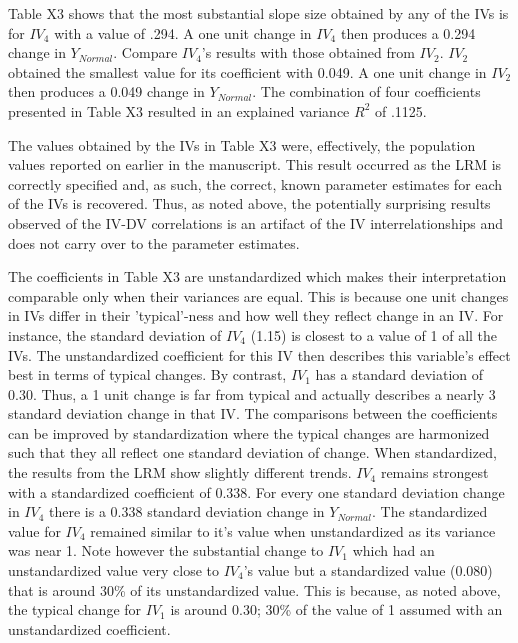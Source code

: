 \documentclass[ShortAfour,times,sageapa]{sagej}
\begin{document}
	Table X3 shows that the most substantial slope size obtained by any of the IVs is for $IV_4$ with a value of .294.  
	A one unit change in $IV_4$ then produces a 0.294 change in $Y_{Normal}$.
	Compare $IV_4$'s results with those obtained from $IV_2$.
	$IV_2$ obtained the smallest value for its coefficient with 0.049.
	A one unit change in $IV_2$ then produces a 0.049 change in $Y_{Normal}$.	
	The combination of four coefficients presented in Table X3 resulted in an explained variance $R^2$ of .1125.
	
	
	The values obtained by the IVs in Table X3 were, effectively, the population values reported on earlier in the manuscript. 
	This result occurred as the LRM is correctly specified and, as such, the correct, known parameter estimates for each of the IVs is recovered.
	Thus, as noted above, the potentially surprising results observed of the IV-DV correlations is an artifact of the IV interrelationships and does not carry over to the parameter estimates.
	
	The coefficients in Table X3 are unstandardized which makes their interpretation comparable only when their variances are equal.
	This is because one unit changes in IVs differ in their 'typical'-ness and how well they reflect change in an IV.
	For instance, the standard deviation of $IV_4$ (1.15) is closest to a value of 1 of all the IVs.  
	The unstandardized coefficient for this IV then describes this variable's effect best in terms of typical changes.
	By contrast, $IV_1$ has a standard deviation of 0.30.
	Thus, a 1 unit change is far from typical and actually describes a nearly 3 standard deviation change in that IV.
	The comparisons between the coefficients can be improved by standardization where the typical changes are harmonized such that they all reflect one standard deviation of change.
	When standardized, the results from the LRM show slightly different trends.
	$IV_4$ remains strongest with a standardized coefficient of 0.338.
	For every one standard deviation change in $IV_4$ there is a 0.338 standard deviation change in $Y_{Normal}$.  
	The standardized value for $IV_4$ remained similar to it's value when unstandardized as its variance was near 1.
	Note however the substantial change to $IV_1$ which had an unstandardized value very close to $IV_4$'s value but a standardized value (0.080) that is around 30\% of its unstandardized value.
	This is because, as noted above, the typical change for $IV_1$ is around 0.30; 30\% of the value of 1 assumed with an unstandardized coefficient.
	
\end{document}
